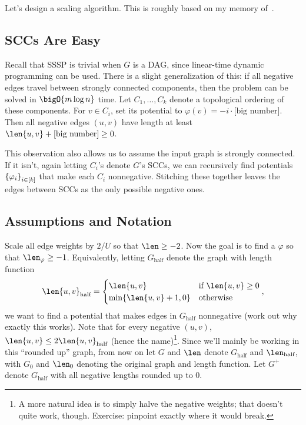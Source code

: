 \documentclass[12pt]{article}
\begin{document}
Let's design a scaling algorithm. This is roughly based on my memory
of~\cite{BNW25}.

\subsection{SCCs Are Easy}

Recall that SSSP is trivial when $G$ is a DAG, since linear-time dynamic
programming can be used. There is a slight generalization of this: if all
negative edges travel between strongly connected components, then the problem
can be solved in $\bigO{m\log n}$ time. Let $C_1, \dots, C_k$ denote a
topological ordering of these components. For $v \in C_i$, set its potential to
$\varphi(v) = -i \cdot \text{[big number]}$. Then all negative edges $(u, v)$
have length at least $\len{u, v} + \text{[big number]} \geq 0$.

This observation also allows us to assume the input graph is strongly connected.
If it isn't, again letting $C_i$'s denote $G$'s SCCs, we can recursively find
potentials $\Set{\varphi_i}_{i \in [k]}$ that make each $C_i$ nonnegative.
Stitching these together leaves the edges between SCCs as the only possible
negative ones.

\subsection{Assumptions and Notation}

\def\half{\text{half}}

Scale all edge weights by $2/U$ so that $\len \geq -2$. Now the goal is to find
a $\varphi$ so that $\len_\varphi \geq -1$. Equivalently, letting $G_\half$
denote the graph with length function
\[
  \len{u, v}_\half
  = \begin{cases}
      \len{u, v}                  & \text{if } \len{u, v} \geq 0 \\
      \min\Set{\len{u, v} + 1, 0} & \text{otherwise}
    \end{cases},
\]
we want to find a potential that makes edges in $G_\half$ nonnegative (work out
why exactly this works). Note that for every negative $(u, v)$,
$\len{u, v} \leq 2\len{u, v}_\half$ (hence the name)\footnote{A more natural
idea is to simply halve the negative weights; that doesn't quite work, though.
Exercise: pinpoint exactly where it would break.}. Since we'll mainly be working
in this ``rounded up'' graph, from now on let $G$ and $\len$ denote $G_\half$
and $\len_\half$, with $G_0$ and $\len_0$ denoting the original graph and length
function. Let $G^+$ denote $G_\half$ with all negative lengths rounded up to
$0$.
\end{document}
